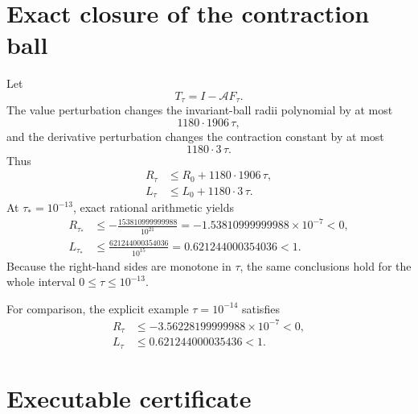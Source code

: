 \documentclass[11pt]{amsart}
\begin{document}
\section{Exact closure of the contraction ball}

Let
\[
  T_\tau=I-\mathcal AF_\tau.
\]
The value perturbation changes the invariant-ball radii polynomial by at
most
\[
  1180\cdot1906\,\tau,
\]
and the derivative perturbation changes the contraction constant by at most
\[
  1180\cdot3\,\tau.
\]
Thus
\begin{align}
  R_\tau&\le R_0+1180\cdot1906\,\tau,
  \label{eq:Rtau}\\
  L_\tau&\le L_0+1180\cdot3\,\tau.
  \label{eq:Ltau}
\end{align}
At $\tau_*=10^{-13}$, exact rational arithmetic yields
\begin{align}
  R_{\tau_*}
  &\le-\frac{153810999999988}{10^{21}}
  =-1.53810999999988\times10^{-7}<0,
  \label{eq:Rend}\\
  L_{\tau_*}
  &\le\frac{621244000354036}{10^{15}}
  =0.621244000354036<1.
  \label{eq:Lend}
\end{align}
Because the right-hand sides are monotone in $\tau$, the same conclusions
hold for the whole interval $0\le\tau\le10^{-13}$.

For comparison, the explicit example $\tau=10^{-14}$ satisfies
\begin{align*}
  R_\tau
  &\le-3.56228199999988\times10^{-7}<0,\\
  L_\tau
  &\le0.621244000035436<1.
\end{align*}

\section{Executable certificate}
\end{document}
